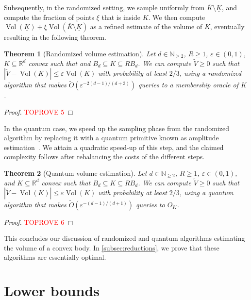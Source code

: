 \documentclass[11pt]{article}
\newtheorem{theorem}{Theorem}[section]
\newcommand{\N}{\ensuremath{\mathbb{N}}}
\newcommand{\R}{\ensuremath{\mathbb{R}}}
\DeclareMathOperator{\Vol}{Vol}
\begin{document}
    Subsequently, in the randomized setting, we sample uniformly from $\overline{K} \setminus \underline{K}$, and compute the fraction of points $\xi$ that is inside $K$. We then compute $\Vol(\underline{K}) + \xi\Vol(\overline{K} \setminus \underline{K})$ as a refined estimate of the volume of $K$, eventually resulting in the following theorem.

    \begin{theorem}[Randomized volume estimation]
        \label{thm:randomized-volume-estimation}
        Let $d \in \N_{\geq 2}$, $R \geq 1$, $\varepsilon \in (0,1)$, $K \subseteq \R^d$ convex such that and $B_d \subseteq K \subseteq RB_d$. We can compute $\widetilde{V} \geq 0$ such that $|\widetilde{V} - \Vol(K)| \leq \varepsilon\Vol(K)$ with probability at least $2/3$, using a randomized algorithm that makes $\widetilde{O}(\varepsilon^{-2(d-1)/(d+3)})$ queries to a membership oracle of $K$.
    \end{theorem}

    \begin{proof}\textcolor{red}{TOPROVE 5}\end{proof}

    In the quantum case, we speed up the sampling phase from the randomized algorithm by replacing it with a quantum primitive known as amplitude estimation~\cite{BHMT98}. We attain a quadratic speed-up of this step, and the claimed complexity follows after rebalancing the costs of the different steps.

    \begin{theorem}[Quantum volume estimation]
        \label{thm:quantum-volume-estimation}
        Let $d \in \N_{\geq 2}$, $R \geq 1$, $\varepsilon \in (0,1)$, and $K \subseteq \R^d$ convex such that $B_d \subseteq K \subseteq RB_d$. We can compute $\widetilde{V} \geq 0$ such that $|\widetilde{V} - \Vol(K)| \leq \varepsilon\Vol(K)$ with probability at least $2/3$, using a quantum algorithm that makes $\widetilde{O}(\varepsilon^{-(d-1)/(d+1)})$ queries to $O_K$.
    \end{theorem}

    \begin{proof}\textcolor{red}{TOPROVE 6}\end{proof}

    This concludes our discussion of randomized and quantum algorithms estimating the volume of a convex body. In \cref{subsec:reductions}, we prove that these algorithms are essentially optimal.

    \section{Lower bounds}
    \label{sec:lower-bounds}
\end{document}
